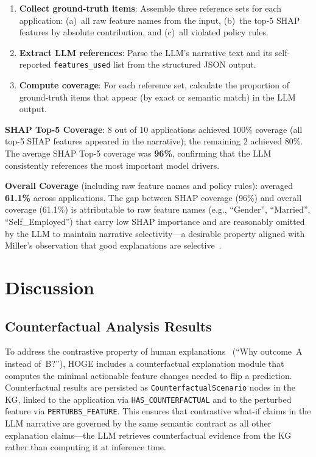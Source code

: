 \documentclass[lnbip]{svmultln}
\begin{document}
\begin{enumerate}
    \item \textbf{Collect ground-truth items}: Assemble three reference sets for each application: (a)~all raw feature names from the input, (b)~the top-5 SHAP features by absolute contribution, and (c)~all violated policy rules.
    \item \textbf{Extract LLM references}: Parse the LLM's narrative text and its self-reported \texttt{features\_used} list from the structured JSON output.
    \item \textbf{Compute coverage}: For each reference set, calculate the proportion of ground-truth items that appear (by exact or semantic match) in the LLM output.
\end{enumerate}

\textbf{SHAP Top-5 Coverage}: 8 out of 10 applications achieved 100\% coverage (all top-5 SHAP features appeared in the narrative); the remaining 2 achieved 80\%. The average SHAP Top-5 coverage was \textbf{96\%}, confirming that the LLM consistently references the most important model drivers.

\textbf{Overall Coverage} (including raw feature names and policy rules): averaged \textbf{61.1\%} across applications. The gap between SHAP coverage (96\%) and overall coverage (61.1\%) is attributable to raw feature names (e.g., ``Gender'', ``Married'', ``Self\_Employed'') that carry low SHAP importance and are reasonably omitted by the LLM to maintain narrative selectivity---a desirable property aligned with Miller's observation that good explanations are selective~\cite{miller2019}.


\section{Discussion}
\label{sec:discussion}

\subsection{Counterfactual Analysis Results}
\label{sec:counterfactual}

To address the contrastive property of human explanations~\cite{miller2019} (``Why outcome~A instead of~B?''), HOGE includes a counterfactual explanation module that computes the minimal actionable feature changes needed to flip a prediction. Counterfactual results are persisted as \texttt{CounterfactualScenario} nodes in the KG, linked to the application via \texttt{HAS\_COUNTERFACTUAL} and to the perturbed feature via \texttt{PERTURBS\_FEATURE}. This ensures that contrastive what-if claims in the LLM narrative are governed by the same semantic contract as all other explanation claims---the LLM retrieves counterfactual evidence from the KG rather than computing it at inference time.
\end{document}
